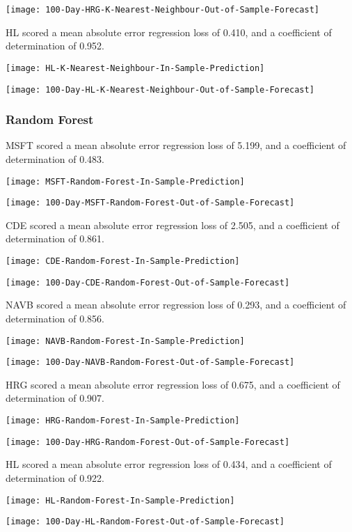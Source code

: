 \texttt{[image: 100-Day-HRG-K-Nearest-Neighbour-Out-of-Sample-Forecast]}

HL scored a mean absolute error regression loss of 0.410, and a coefficient of determination of 0.952.

\texttt{[image: HL-K-Nearest-Neighbour-In-Sample-Prediction]}

\texttt{[image: 100-Day-HL-K-Nearest-Neighbour-Out-of-Sample-Forecast]}

\subsubsection{Random Forest}
MSFT scored a mean absolute error regression loss of 5.199, and a coefficient of determination of 0.483.

\texttt{[image: MSFT-Random-Forest-In-Sample-Prediction]}

\texttt{[image: 100-Day-MSFT-Random-Forest-Out-of-Sample-Forecast]}

CDE scored a mean absolute error regression loss of 2.505, and a coefficient of determination of 0.861.

\texttt{[image: CDE-Random-Forest-In-Sample-Prediction]}

\texttt{[image: 100-Day-CDE-Random-Forest-Out-of-Sample-Forecast]}

NAVB scored a mean absolute error regression loss of 0.293, and a coefficient of determination of 0.856.

\texttt{[image: NAVB-Random-Forest-In-Sample-Prediction]}

\texttt{[image: 100-Day-NAVB-Random-Forest-Out-of-Sample-Forecast]}

HRG scored a mean absolute error regression loss of 0.675, and a coefficient of determination of 0.907.

\texttt{[image: HRG-Random-Forest-In-Sample-Prediction]}

\texttt{[image: 100-Day-HRG-Random-Forest-Out-of-Sample-Forecast]}

HL scored a mean absolute error regression loss of 0.434, and a coefficient of determination of 0.922.

\texttt{[image: HL-Random-Forest-In-Sample-Prediction]}

\texttt{[image: 100-Day-HL-Random-Forest-Out-of-Sample-Forecast]}


